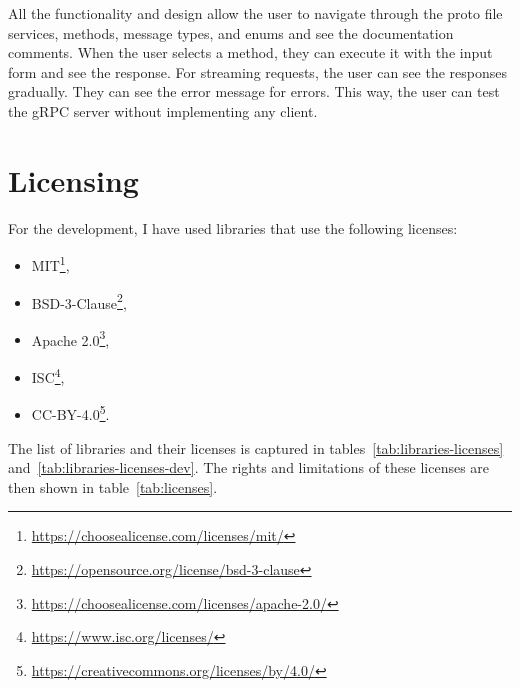 All the functionality and design allow the user to navigate through the proto file services, methods, message types, and enums and see the documentation comments.
When the user selects a method, they can execute it with the input form and see the response.
For streaming requests, the user can see the responses gradually.
They can see the error message for errors.
This way, the user can test the gRPC server without implementing any client.


\section{Licensing}
For the development, I have used libraries that use the following licenses:
\begin{itemize}
    \item MIT\footnote{\url{https://choosealicense.com/licenses/mit/}},
    \item BSD-3-Clause\footnote{\url{https://opensource.org/license/bsd-3-clause}},
    \item Apache 2.0\footnote{\url{https://choosealicense.com/licenses/apache-2.0/}},
    \item ISC\footnote{\url{https://www.isc.org/licenses/}},
    \item CC-BY-4.0\footnote{\url{https://creativecommons.org/licenses/by/4.0/}}.
\end{itemize}

The list of libraries and their licenses is captured in tables~\ref{tab:libraries-licenses} and~\ref{tab:libraries-licenses-dev}.
The rights and limitations of these licenses are then shown in table~\ref{tab:licenses}.

